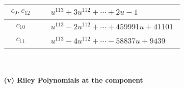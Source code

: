 \documentclass[1p]{elsarticle_modified}
\theoremstyle{definition}
\begin{document}
\begin{tabular}{m{50pt}|m{274pt}}
\hline $$\begin{aligned}c_{9},c_{12}\end{aligned}$$&$\begin{aligned}
&u^{113}+3 u^{112}+\cdots+2 u-1
\end{aligned}$\\
\hline $$\begin{aligned}c_{10}\end{aligned}$$&$\begin{aligned}
&u^{113}-2 u^{112}+\cdots+459991 u+41101
\end{aligned}$\\
\hline $$\begin{aligned}c_{11}\end{aligned}$$&$\begin{aligned}
&u^{113}-4 u^{112}+\cdots-58837 u+9439
\end{aligned}$\\
\hline
\end{tabular}\\~\\
\newpage\renewcommand{\arraystretch}{1}
\flushleft \textbf{(v) Riley Polynomials at the component}\newline \\
\end{document}
